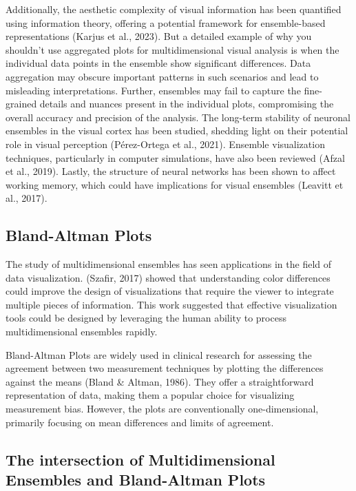 \documentclass[print]{nuthesis}
\begin{document}
Additionally, the aesthetic complexity of visual information has been quantified using information theory, offering a potential framework for ensemble-based representations (Karjus et al., 2023).
But a detailed example of why you shouldn't use aggregated plots for multidimensional visual analysis is when the individual data points in the ensemble show significant differences. Data aggregation may obscure important patterns in such scenarios and lead to misleading interpretations.
Further, ensembles may fail to capture the fine-grained details and nuances present in the individual plots, compromising the overall accuracy and precision of the analysis.
The long-term stability of neuronal ensembles in the visual cortex has been studied, shedding light on their potential role in visual perception (Pérez-Ortega et al., 2021).
Ensemble visualization techniques, particularly in computer simulations, have also been reviewed (Afzal et al., 2019).
Lastly, the structure of neural networks has been shown to affect working memory, which could have implications for visual ensembles (Leavitt et al., 2017).

\hypertarget{bland-altman-plots}{%
\subsection{Bland-Altman Plots}\label{bland-altman-plots}}

The study of multidimensional ensembles has seen applications in the field of data visualization.
(Szafir, 2017) showed that understanding color differences could improve the design of visualizations that require the viewer to integrate multiple pieces of information.
This work suggested that effective visualization tools could be designed by leveraging the human ability to process multidimensional ensembles rapidly.

Bland-Altman Plots are widely used in clinical research for assessing the agreement between two measurement techniques by plotting the differences against the means (Bland \& Altman, 1986).
They offer a straightforward representation of data, making them a popular choice for visualizing measurement bias.
However, the plots are conventionally one-dimensional, primarily focusing on mean differences and limits of agreement.

\hypertarget{the-intersection-of-multidimensional-ensembles-and-bland-altman-plots}{%
\subsection{The intersection of Multidimensional Ensembles and Bland-Altman Plots}\label{the-intersection-of-multidimensional-ensembles-and-bland-altman-plots}}
\end{document}
